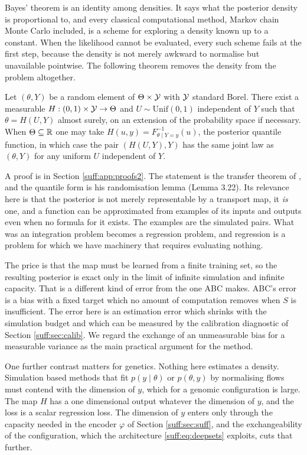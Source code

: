 Bayes' theorem is an identity among densities. It says what the posterior density is
proportional to, and every classical computational method, Markov chain Monte Carlo included,
is a scheme for exploring a density known up to a constant. When the likelihood cannot be
evaluated, every such scheme fails at the first step, because the density is not merely
awkward to normalise but unavailable pointwise. The following theorem removes the density from
the problem altogether.

\begin{theorem}
\label{suff:thm:noise}
Let $(\theta,Y)$ be a random element of $\Theta\times\mathcal{Y}$ with $\mathcal{Y}$ standard Borel. There
exist a measurable $H:(0,1)\times\mathcal{Y}\to\Theta$ and $U\sim\mathrm{Unif}(0,1)$ independent of
$Y$ such that $\theta = H(U,Y)$ almost surely, on an extension of the probability space if necessary. When $\Theta\subseteq\mathbb{R}$ one may take
$H(u,y)=F^{-1}_{\theta\mid Y=y}(u)$, the posterior quantile function, in which case the
pair $(H(U,Y),Y)$ has the same joint law as $(\theta,Y)$ for any uniform $U$ independent of
$Y$.
\end{theorem}

A proof is in Section \ref{suff:app:proofs2}. The statement is the transfer theorem of
\citet[Theorem 6.10]{suff:kallenberg2002}, and the quantile form is his randomisation lemma (Lemma 3.22). Its relevance here is that the posterior is not
merely representable by a transport map, it \emph{is} one, and a function can be approximated
from examples of its inputs and outputs even when no formula for it exists. The examples are
the simulated pairs. What was an integration problem becomes a regression problem, and
regression is a problem for which we have machinery that requires evaluating nothing.

The price is that the map must be learned from a finite training set, so the resulting
posterior is exact only in the limit of infinite simulation and infinite capacity. That is a
different kind of error from the one ABC makes. ABC's error is a bias with a fixed target
which no amount of computation removes when $S$ is insufficient. The error here is an
estimation error which shrinks with the simulation budget and which can be measured by the
calibration diagnostic of Section \ref{suff:sec:calib}. We regard the exchange of an
unmeasurable bias for a measurable variance as the main practical argument for the method.

One further contrast matters for genetics. Nothing here estimates a density. Simulation based
methods that fit $p(y\mid\theta)$ or $p(\theta,y)$ by normalising flows must contend with the
dimension of $y$, which for a genomic configuration is large. The map $H$ has a one
dimensional output whatever the dimension of $y$, and the loss is a scalar regression loss.
The dimension of $y$ enters only through the capacity needed in the encoder $\varphi$ of
Section \ref{suff:sec:suff}, and the exchangeability of the configuration, which the
architecture \eqref{suff:eq:deepsets} exploits, cuts that further.

